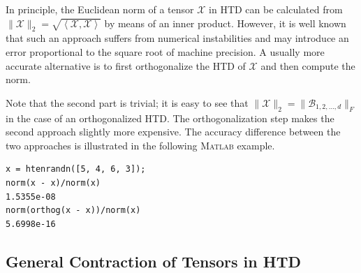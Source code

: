 \documentclass[11pt, a4paper]{article}
\newcommand{\calB}{\mathcal{B}}
\newcommand{\calX}{\mathcal{X}}
\newcommand{\innerprod}[2]{{\left\langle#1,#2\right\rangle}}
\begin{document}
In principle, the Euclidean norm of a tensor $\calX$ in HTD
can be calculated from $\| \calX \|_2 = \sqrt{\innerprod{\calX}{\calX}}$ by
means of an inner product. However, it is well
known that such an approach suffers from numerical instabilities and
may introduce an error proportional to the square root of machine precision.
A usually more accurate alternative is to first orthogonalize the HTD of $\calX$
and then compute the norm.
\begin{preprint}
 Note that the second part is trivial; it is
easy to see that $\|\calX\|_2 = \|\calB_{1,2,\ldots,d}\|_F$ in the case of an orthogonalized
HTD. The orthogonalization step makes the second approach slightly more expensive.
The accuracy difference between the two approaches is 
illustrated in the following \textsc{Matlab} example.
%
\begin{framed}\noindent
\vspace{-2ex}
\begin{verbatim}
x = htenrandn([5, 4, 6, 3]);
norm(x - x)/norm(x)
1.5355e-08
norm(orthog(x - x))/norm(x)
5.6998e-16
\end{verbatim}
\vspace{-2ex}
\end{framed}
\end{preprint}

\subsection{General Contraction of Tensors in HTD} \label{sec:generalcontraction}
\end{document}
